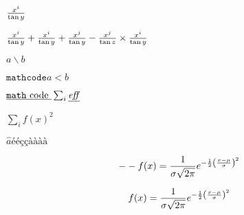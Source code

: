 \documentclass{minimal}
\begin{document}
\begin{preview}
${x^i}\over{\tan y}$
\end{preview}

\begin{preview}
${{x^i}\over{\tan y}} + \frac{x^i}{\tan y} + \frac{x^j}{\tan y} - \frac{x^j}{\tan z}
 \times \frac{x^i}{\tan y}$
\end{preview}

\begin{preview}
$a \backslash{} b $
\end{preview}

\begin{preview}
$\mathtt{math code} a < b$
\end{preview}

\begin{preview}
$\underline{\mathtt{math \hbox{ code }}} \sum_{i}{\underline{\mathit{eff}}}$
\end{preview}

\begin{preview}
$\sum_{i} f(x)^{2}$
\end{preview}

\begin{preview}
$\hat{a}ééççàààà$
\end{preview}

\begin{preview}

\[-- f(x) = {1 \over \sigma \sqrt{2\pi}}e^{-{1 \over 2}\left({x-\mu \over \sigma}\right)^2}
\]
\end{preview}

\begin{preview}

\[ f(x)
= {1\over\sigma\sqrt{2\pi}}
     e^{-{1\over2}\left({x-\mu\over\sigma}\right)^2}
\]
\end{preview}
\end{document}
